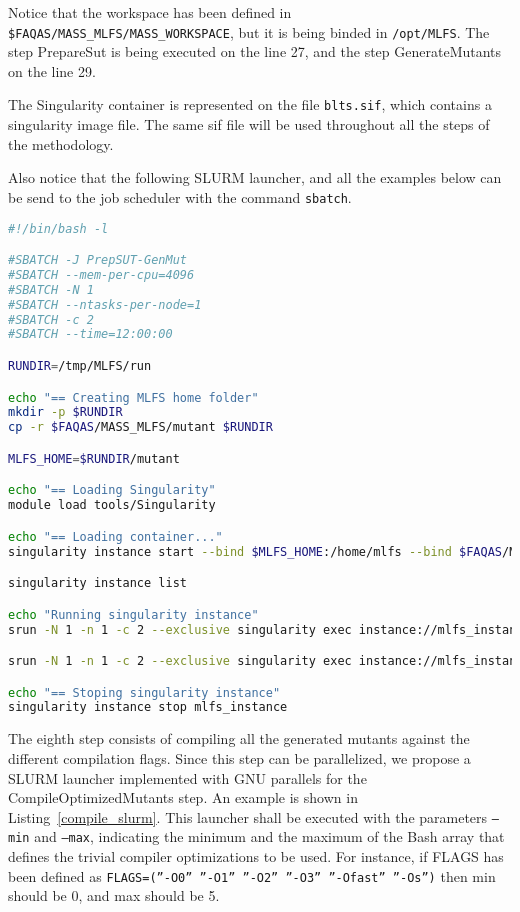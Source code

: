 Notice that the workspace has been defined in \texttt{\$FAQAS/MASS\_MLFS/MASS\_WORKSPACE}, but it is being binded in \texttt{/opt/MLFS}. 
The step PrepareSut is being executed on the line 27, and the step GenerateMutants on the line 29.

The Singularity container is represented on the file \texttt{blts.sif}, which contains a singularity image file. The same sif file will be used throughout all the steps of the methodology.

Also notice that the following SLURM launcher, and all the examples below can be send to the job scheduler with the command \texttt{sbatch}.

\begin{lstlisting}[language=bash, label=prepare_slurm ,caption=Example of the SLURM launcher for PrepareSUT and GenerateMutants steps.]
#!/bin/bash -l

#SBATCH -J PrepSUT-GenMut
#SBATCH --mem-per-cpu=4096
#SBATCH -N 1
#SBATCH --ntasks-per-node=1
#SBATCH -c 2
#SBATCH --time=12:00:00

RUNDIR=/tmp/MLFS/run

echo "== Creating MLFS home folder"
mkdir -p $RUNDIR
cp -r $FAQAS/MASS_MLFS/mutant $RUNDIR

MLFS_HOME=$RUNDIR/mutant

echo "== Loading Singularity"
module load tools/Singularity

echo "== Loading container..."
singularity instance start --bind $MLFS_HOME:/home/mlfs --bind $FAQAS/MASS_MLFS/unit-test-suite:/home/mlfs/unit-test-suite --bind $FAQAS/MASS_MLFS/unit-reports:/home/mlfs/unit-reports --bind $FAQAS/MASS_MLFS/MASS_WORKSPACE:/opt/MLFS --bind $FAQAS/srcirorfaqas:/opt/srcirorfaqas $FAQAS/MASS_MLFS/blts.sif mlfs_instance

singularity instance list

echo "Running singularity instance"
srun -N 1 -n 1 -c 2 --exclusive singularity exec instance://mlfs_instance /bin/bash /opt/MLFS/PrepareSUT.sh

srun -N 1 -n 1 -c 2 --exclusive singularity exec instance://mlfs_instance /bin/bash /opt/MLFS/GenerateMutants.sh

echo "== Stoping singularity instance"
singularity instance stop mlfs_instance
\end{lstlisting}

The eighth step consists of compiling all the generated mutants against the different compilation flags. Since this step can be parallelized, we propose a SLURM launcher implemented with GNU parallels for the CompileOptimizedMutants step. An example is shown in Listing~\ref{compile_slurm}. This launcher shall be executed with the parameters \texttt{--min} and \texttt{--max}, indicating the minimum and the maximum of the Bash array that defines the trivial compiler optimizations to be used. For instance, if FLAGS has been defined as \texttt{FLAGS=(”-O0” ”-O1” ”-O2” ”-O3” ”-Ofast” ”-Os”)} then min should be 0, and max should be 5.

